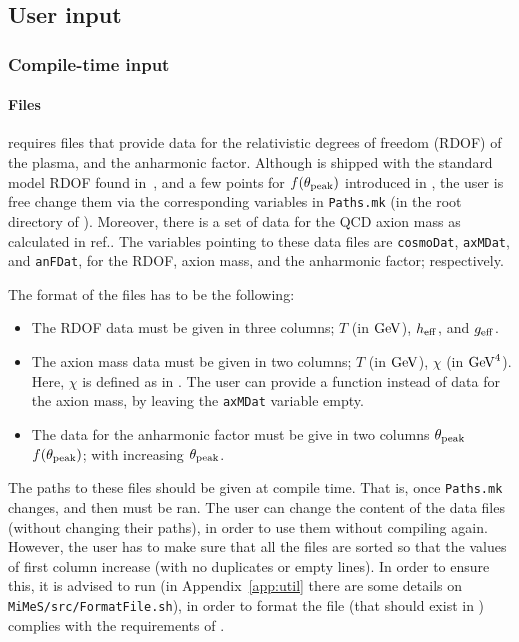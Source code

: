 \documentclass[11pt,a4paper]{article}
\begin{document}
\subsection{User input}\label{sec:input}
%
\subsubsection{Compile-time input}\label{sec:compile_time_input} 
%
\paragraph{Files} \mimes requires files that provide data for the relativistic degrees of freedom (RDOF) of the plasma, and the anharmonic factor. Although \mimes is shipped with the standard model RDOF found in~\cite{Saikawa:2020swg}, and a few points for $f(\theta_{\rm peak}{})$ introduced in , the user is free change them via the corresponding variables in {\tt Paths.mk} (in the root directory of \mimes). Moreover, there is a set of data for the QCD axion mass as calculated in ref.\cite{Borsanyi:2016ksw}.
%
The variables pointing to these data files are {\tt cosmoDat}, {\tt axMDat}, and {\tt anFDat}, for the RDOF, axion mass, and the anharmonic factor; respectively.

The format of the files has to be the following:
%
\begin{itemize}
	\item The RDOF data must be given in three columns; $T$ (in ${\rm GeV}$), $h_{\rm eff}{}$, and $g_{\rm eff}{}$.
	\item The axion mass data must be given in two columns; $T$ (in ${\rm GeV}$), $\chi$ (in ${\rm GeV}^4$). Here, $\chi$ is defined as in . 
	The user can provide a function instead of data for the axion mass, by leaving the  {\tt axMDat} variable empty. 
	\item The data for the anharmonic factor must be give in two columns   $\theta_{\rm peak}{}$ $f(\theta_{\rm peak}{})$; with increasing $\theta_{\rm peak}{}$.
\end{itemize}
%
The paths to these files should be given at compile time. That is, once {\tt Paths.mk} changes,  and then  must be ran. The user can change the content of the data files (without changing their paths), in order to use them without compiling \mimes again. However, the user has to make sure that all the files are sorted so that the values of first column increase (with no duplicates or empty lines). In order to ensure this, it is advised to run  (in Appendix~\ref{app:util} there are some details on {\tt MiMeS/src/FormatFile.sh}), in order to format the file (that should exist in ) complies with the requirements of \mimes.
\end{document}
